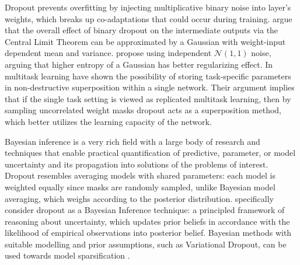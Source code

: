 \documentclass[a4paper,10pt]{article}
\begin{document}
Dropout \citep{hinton_improving_2012} prevents overfitting by injecting multiplicative
binary noise into layer's weights, which breaks up co-adaptations that could occur
during training. \citet{wang_fast_2013} argue that the overall effect of binary dropout
on the intermediate outputs via the Central Limit Theorem can be approximated by a Gaussian
with weight-input dependent mean and variance. \citet{srivastava_dropout_2014} propose
using independent $\mathcal{N}(1,1)$ noise, arguing that higher entropy of a Gaussian has
better regularizing effect. In multitask learning \citet{cheung_superposition_2019}
have shown the possibility of storing task-specific parameters in non-destructive superposition
within a single network. Their argument implies that if the single task setting is viewed
as replicated multitask learning, then by sampling uncorrelated weight masks dropout acts
as a superposition method, which better utilizes the learning capacity of the network.

Bayesian inference is a very rich field with a large body of research and techniques that
enable practical quantification of predictive, parameter, or model uncertainty and its 
propagation into solutions of the problems of interest.
%
Dropout resembles averaging models with shared parameters: each model is weighted equally
since masks are randomly sampled, unlike Bayesian model averaging, which weighs according to
the posterior distribution. \citet{kingma_variational_2015} specifically consider dropout
as a Bayesian Inference technique: a principled framework of reasoning about uncertainty,
which updates prior beliefs in accordance with the likelihood of empirical observations
into posterior belief. Bayesian methods with suitable modelling and prior assumptions, such
as Variational Dropout, can be used towards model sparsification
\citep{kingma_variational_2015,molchanov_variational_2017,kharitonov_variational_2018}.
\end{document}
